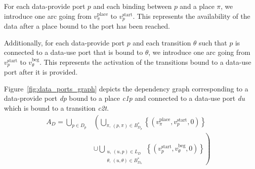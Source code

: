 


For each data-provide port $p$ and each binding between $p$ and a
place $\pi$, we introduce one arc going from $v_\pi^\text{place}$ to
$v_p^\text{start}$. This represents the availability of the data after
a place bound to the port has been reached.

Additionally, for each data-provide port $p$ and each transition
$\theta$ such that $p$ is connected to a data-use port that is bound
to $\theta$, we introduce one arc going from $v_p^\text{start}$ to
$v_\theta^\text{beg}$.  This represents the activation of the transitions
bound to a data-use port after it is provided.

Figure~\ref{fig:data_ports_graph} depicts the dependency graph corresponding to a
data-provide port \emph{dp} bound to a place \emph{c1p} and connected to
a data-use port \emph{du} which is bound to a transition \emph{c2t}.
\begin{align*}
A_{D}=\bigcup_{p\in D_p}
& \left(\bigcup_{\pi,\,\left(p,\pi\right)\in B_{D_{p}}^*}\left\{ \left(v_\pi^\text{place},v_p^\text{start},0\right)\right\}\right. \\
& \left.\cup\bigcup_{\substack{u,\,\left(u,p\right)\in L_D \\
  \theta,\,\left(u,\theta\right)\in B_{D_{u}}^*}}\left\{ \left(v_p^\text{start},v_\theta^\text{beg},0\right)\right\}\right)
\end{align*}




